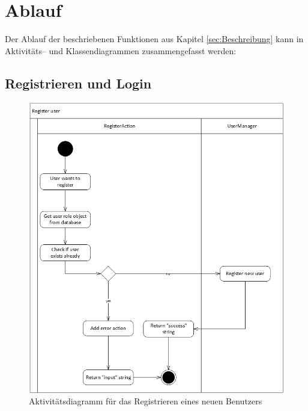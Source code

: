\documentclass[12pt,a4paper]{article}
\begin{document}
	
	\section{Ablauf}
	Der Ablauf der beschriebenen Funktionen aus Kapitel \ref{sec:Beschreibung} kann in  Aktivitäts-- und Klassendiagrammen zusammengefasst werden:
	
	\subsection{Registrieren und Login}
	\begin{figure}[H]
		\centering
		\includegraphics[scale=0.5]{diagrams/RegisterUser_activity.jpg}
		\caption{Aktivitätsdiagramm für das Registrieren eines neuen Benutzers}
	\end{figure}
\end{document}
